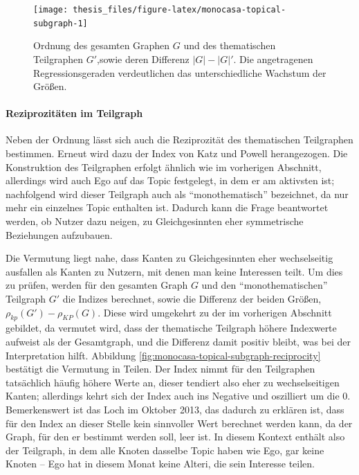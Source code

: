 \documentclass[11pt,a4paper,twoside]{article}
\let\oldpar\paragraph
\renewcommand{\paragraph}{\oldpar*}
\begin{document}
\begin{figure}

{\centering \texttt{[image: thesis\_files/figure-latex/monocasa-topical-subgraph-1]} 

}

\caption{Ordnung des gesamten Graphen \(G\) und
des thematischen Teilgraphen \(G'\),sowie deren Differenz
\(|G| - |G|'\). Die angetragenen Regressionsgeraden verdeutlichen das
unterschiedliche Wachstum der Größen.}\label{fig:monocasa-topical-subgraph}
\end{figure}

\hypertarget{reziprozitaten-im-teilgraph}{%
\paragraph{Reziprozitäten im
Teilgraph}\label{reziprozitaten-im-teilgraph}}

Neben der Ordnung lässt sich auch die Reziprozität des thematischen
Teilgraphen bestimmen. Erneut wird dazu der Index von Katz und Powell
herangezogen. Die Konstruktion des Teilgraphen erfolgt ähnlich wie im
vorherigen Abschnitt, allerdings wird auch Ego auf das Topic festgelegt,
in dem er am aktivsten ist; nachfolgend wird dieser Teilgraph auch als
\enquote{monothematisch} bezeichnet, da nur mehr ein einzelnes Topic
enthalten ist. Dadurch kann die Frage beantwortet werden, ob Nutzer dazu
neigen, zu Gleichgesinnten eher symmetrische Beziehungen aufzubauen.

Die Vermutung liegt nahe, dass Kanten zu Gleichgesinnten eher
wechselseitig ausfallen als Kanten zu Nutzern, mit denen man keine
Interessen teilt. Um dies zu prüfen, werden für den gesamten Graph \(G\)
und den \enquote{monothematischen} Teilgraph \(G'\) die Indizes
berechnet, sowie die Differenz der beiden Größen,
\(\rho_{kp}(G')-\rho_{KP}(G)\). Diese wird umgekehrt zu der im
vorherigen Abschnitt gebildet, da vermutet wird, dass der thematische
Teilgraph höhere Indexwerte aufweist als der Gesamtgraph, und die
Differenz damit positiv bleibt, was bei der Interpretation hilft.
Abbildung \ref{fig:monocasa-topical-subgraph-reciprocity} bestätigt die
Vermutung in Teilen. Der Index nimmt für den Teilgraphen tatsächlich
häufig höhere Werte an, dieser tendiert also eher zu wechselseitigen
Kanten; allerdings kehrt sich der Index auch ins Negative und oszilliert
um die 0. Bemerkenswert ist das Loch im Oktober 2013, das dadurch zu
erklären ist, dass für den Index an dieser Stelle kein sinnvoller Wert
berechnet werden kann, da der Graph, für den er bestimmt werden soll,
leer ist. In diesem Kontext enthält also der Teilgraph, in dem alle
Knoten dasselbe Topic haben wie Ego, gar keine Knoten -- Ego hat in
diesem Monat keine Alteri, die sein Interesse teilen.
\end{document}

